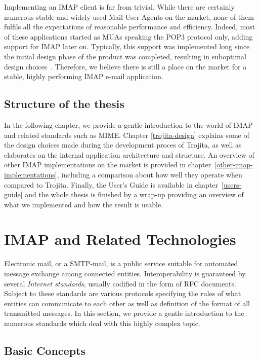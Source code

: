 \documentclass[12pt,notitlepage]{report}
\newcommand{\trojita}{Trojita\xspace}
\begin{document}
Implementing an IMAP client is far from trivial.  While there are certainly
numerous stable and widely-used Mail User Agents on the market, none of them
fulfils all the expectations of reasonable performance and efficiency.  Indeed,
most of these applications started as MUAs speaking the POP3 protocol only,
adding support for IMAP later on.  Typically, this support was implemented long
since the initial design phase of the product was completed, resulting in
suboptimal design choices~\cite{crispin-ten-commandments}.  Therefore, we
believe there is still a place on the market for a stable, highly performing
IMAP e-mail application.

\section{Structure of the thesis}

In the following chapter, we provide a gentle introduction to the world of IMAP
and related standards such as MIME.  Chapter \ref{trojita-design} explains some
of the design choices made during the development proces of \trojita, as well as
elaborates on the internal application architecture and structure.  An overview
of other IMAP implementations on the market is provided in
chapter~\ref{other-imap-implementations}, including a comparison about how well
they operate when compared to \trojita.  Finally, the User's Guide is
available in chapter~\ref{users-guide} and the whole thesis is finished by a
wrap-up providing an overview of what we implemented and how the result is
usable.

\chapter{IMAP and Related Technologies}

Electronic mail, or a SMTP-mail, is a public service suitable for automated
message exchange among connected entities.  Interoperability is guaranteed by
several {\em Internet standards}, usually codified in the form of RFC documents.
Subject to these standards are various protocols specifying the rules of what
entities can communicate to each other as well as definition of the format of
all transmitted messages. In this section, we provide a gentle introduction to
the numerous standards which deal with this highly complex topic.

\section{Basic Concepts}
\end{document}
